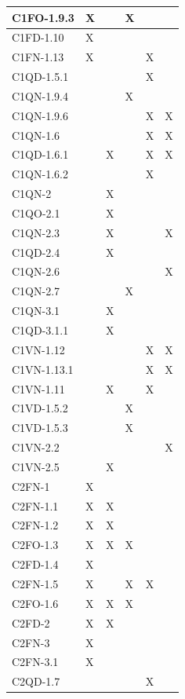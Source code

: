 \begin{footnotesize}
\begin{longtable}{|p{}|p{}|p{}|p{}|p{}|p{}|}
 C1FO-1.9.3& X&  &  X&  &  \\ \hline
 C1FD-1.10& X&  &  &  &  \\ \hline
 C1FN-1.13& X&  &  &  X&  \\ \hline
 C1QD-1.5.1& &  &  &  X&  \\ \hline
 C1QN-1.9.4& &  &  X&  &  \\ \hline
 C1QN-1.9.6& &  &  &  X&  X\\ \hline
 C1QN-1.6& &  &  &  X&  X\\ \hline
 C1QD-1.6.1& &  X&  &  X&  X\\ \hline
 C1QN-1.6.2& &  &  &  X&  \\ \hline
 C1QN-2& &  X&  &  &  \\ \hline
 C1QO-2.1& &  X&  &  &  \\ \hline
 C1QN-2.3& &  X&  &  &  X\\ \hline
 C1QD-2.4& &  X&  &  &  \\ \hline
 C1QN-2.6& &  &  &  &  X\\ \hline
 C1QN-2.7& &  &  X&  &  \\ \hline
 C1QN-3.1& &  X&  &  &  \\ \hline
 C1QD-3.1.1& &  X&  &  &  \\ \hline
 C1VN-1.12& &  &  &  X&  X\\ \hline
 C1VN-1.13.1& &  &  &  X&  X\\ \hline
 C1VN-1.11& &  X&  &  X&  \\ \hline
 C1VD-1.5.2& &  &  X&  &  \\ \hline
 C1VD-1.5.3& &  &  X&  &  \\ \hline
 C1VN-2.2& &  &  &  &  X\\ \hline
 C1VN-2.5& &  X&  &  &  \\ \hline
 C2FN-1& X&  &  &  &  \\ \hline
 C2FN-1.1& X&  X&  &  &  \\ \hline
 C2FN-1.2& X&  X&  &  &  \\ \hline
 C2FO-1.3& X&  X&  X&  &  \\ \hline
 C2FD-1.4& X&  &  &  &  \\ \hline
 C2FN-1.5& X&  &  X&  X&  \\ \hline
 C2FO-1.6& X&  X&  X&  &  \\ \hline
 C2FD-2& X&  X&  &  &  \\ \hline
 C2FN-3& X&  &  &  &  \\ \hline
 C2FN-3.1& X&  &  &  &  \\ \hline
 C2QD-1.7& &  &  &  X&  \\ \hline

\end{longtable}
\end{footnotesize}
